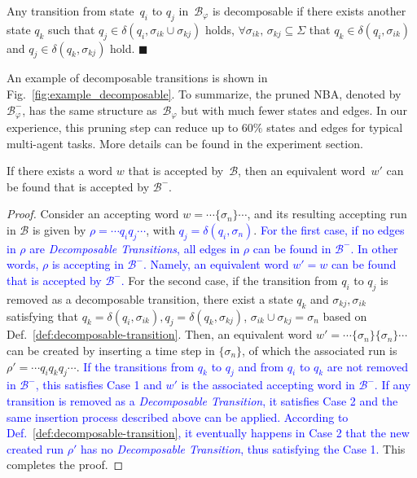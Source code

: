 \begin{definition}\label{def:decomposable-transition}
Any transition from state~$q_i$ to $q_j$ in~$\mathcal{B}_{\varphi}$ is decomposable if there exists another state $q_k$ such that $q_j\in \delta(q_i,\sigma_{ik}\cup\sigma_{kj})$ holds,
$\forall \sigma_{ik},\,\sigma_{kj} \subseteq \Sigma$ that $q_k\in \delta(q_i,\sigma_{ik})$ and $q_j\in \delta(q_k,\sigma_{kj})$ hold.
\hfill $\blacksquare$
\end{definition}

An example of decomposable transitions is shown in Fig.~\ref{fig:example_decomposable}.
To summarize, the pruned NBA, denoted by~$\mathcal{B}^{-}_{\varphi}$,
has the same structure as~$\mathcal{B}_{\varphi}$ but with much fewer states and edges.
In our experience, this pruning step can reduce up to $60\%$ states and edges for typical multi-agent tasks.
More details can be found in the experiment section.
\begin{lemma}
  If there exists a word $w$ that is accepted by~$\mathcal{B}$,
  then an equivalent word~$w'$ can be found that is accepted by $\mathcal{B}^-$.
\end{lemma}
\begin{proof}
	Consider an accepting word $w=\cdots\{\sigma_n\}\cdots$, and its resulting accepting
	run in $\mathcal{B}$ is given by \textcolor{blue}{$\rho=\cdots q_{i}q_{j}\cdots$},
	with \textcolor{blue}{$q_{j}=\delta(q_i,\sigma_n)$}.
	\textcolor{blue}{For the first case,
          if no edges in $\rho$ are \emph{Decomposable Transitions}, all edges in $\rho$
	can be found in $\mathcal{B}^-$. In other words, $\rho$ is accepting in $\mathcal{B}^-$.
	Namely, an equivalent word $w'=w$ can be found that is accepted by $\mathcal{B}^-$.}
	For the second case, if the transition from $q_{i}$ to $q_j$ is removed
	as a decomposable transition, there exist a state $q_k$ and $\sigma_{kj},\sigma_{ik}$
        satisfying that
	$q_k=\delta(q_i,\sigma_{ik}),q_j=\delta(q_k,\sigma_{kj})$,
        $\sigma_{ik}\cup \sigma_{kj}=\sigma_n$ based on Def.~\ref{def:decomposable-transition}.
	Then, an equivalent word $w'=\cdots\{\sigma_n\}\{\sigma_n\}\cdots$ can
	be created by inserting a time step in $\{\sigma_n\}$, of which the associated
	run is $\rho'=\cdots q_iq_kq_j\cdots$.
	\textcolor{blue}{If the transitions from $q_k$ to $q_j$ and from $q_i$ to $q_k$
	are not removed in $\mathcal{B}^-$,
        this satisfies Case 1 and $w'$ is the associated accepting word in $\mathcal{B}^-$.
	If any transition is removed as a \emph{Decomposable Transition}, it satisfies Case 2
        and the same insertion process described above can be applied.
	According to Def.~\ref{def:decomposable-transition}, it eventually happens in Case 2 that the new created run $\rho'$ has no \emph{Decomposable Transition}, thus satisfying the Case 1.}
 This completes the proof.
\end{proof}




